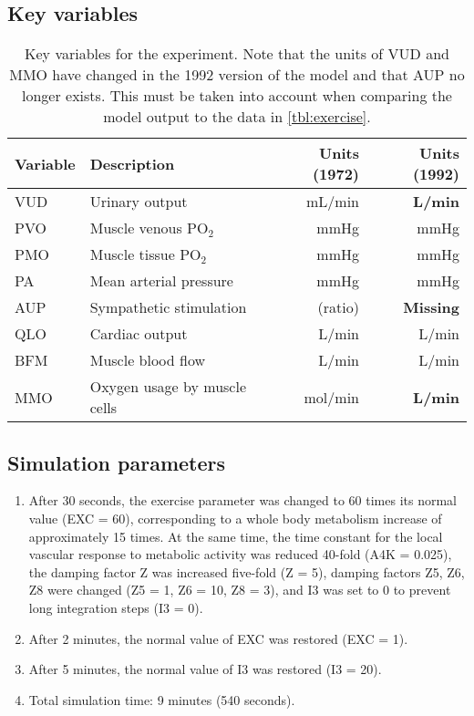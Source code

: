 \label{exp:exercise}

\subsection{Key variables}
\begin{table}[!h]
  \centering
  \begin{tabularx}{\textwidth}{lXrr}
    \toprule
    Variable & Description & Units (1972) & Units (1992) \\
    \midrule
    VUD & Urinary output & mL/min & \textbf{L/min} \\
    PVO & Muscle venous PO$_2$ & mmHg & mmHg \\
    PMO & Muscle tissue PO$_2$ & mmHg & mmHg \\
    PA & Mean arterial pressure & mmHg & mmHg \\
    AUP & Sympathetic stimulation & (ratio) & \textbf{Missing} \\
    QLO & Cardiac output & L/min & L/min \\
    BFM & Muscle blood flow & L/min & L/min \\
    MMO & Oxygen usage by muscle cells & mol/min & \textbf{L/min} \\
    \bottomrule
  \end{tabularx}
  \caption{Key variables for the experiment. Note that the units of VUD and MMO have changed in the 1992 version of the model and that AUP no longer exists. This must be taken into account when comparing the model output to the data in \autoref{tbl:exercise}.}
\end{table}

\subsection{Simulation parameters}
\begin{enumerate}
  \item After 30 seconds, the exercise parameter was changed to 60 times its normal value (EXC = 60), corresponding to a whole body metabolism increase of approximately 15 times. At the same time, the time constant for the local vascular response to metabolic activity was reduced 40-fold (A4K = 0.025), the damping factor Z was increased five-fold (Z = 5), damping factors Z5, Z6, Z8 were changed (Z5 = 1, Z6 = 10, Z8 = 3), and I3 was set to 0 to prevent long integration steps (I3 = 0).
  \item After 2 minutes, the normal value of EXC was restored (EXC = 1).
  \item After 5 minutes, the normal value of I3 was restored (I3 = 20).
  \item Total simulation time: 9 minutes (540 seconds).
\end{enumerate}


